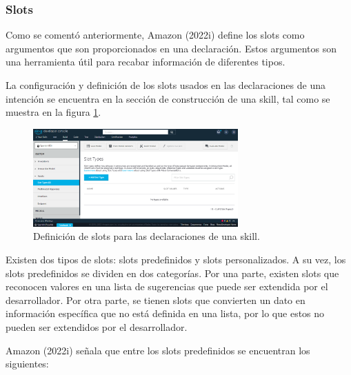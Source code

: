 
\subsubsection{Slots}
\label{SlotscapIV}

Como se comentó anteriormente, Amazon (2022i) define los slots como argumentos que son proporcionados en una declaración. Estos argumentos son una herramienta útil para recabar información de diferentes tipos.

La configuración y definición de los slots usados en las declaraciones de una intención se encuentra en la sección de construcción de una skill, tal como se muestra en la figura \ref{fig:49}.

\begin{figure}
  \centering
  \includegraphics[width=0.70\textwidth]{Cap4/Figuras/SlotTypes.png}
  \caption{Definición de slots para las declaraciones de una skill.}
  \label{fig:49}
\end{figure}

Existen dos tipos de slots: slots predefinidos y slots personalizados. A su vez, los slots predefinidos se dividen en dos categorías. Por una parte, existen slots que reconocen valores en una lista de sugerencias que puede ser extendida por el desarrollador. Por otra parte, se tienen slots que convierten un dato en información específica que no está definida en una lista, por lo que estos no pueden ser extendidos por el desarrollador.

Amazon (2022i) señala que entre los slots predefinidos se encuentran los siguientes:

